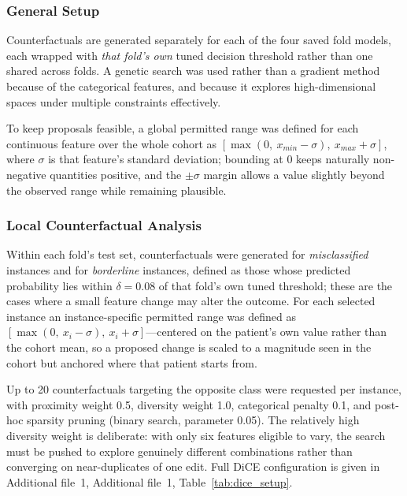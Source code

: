 \documentclass[pdflatex,sn-mathphys-num]{sn-jnl}%
\theoremstyle{thmstyleone}%
\theoremstyle{thmstyletwo}%
\theoremstyle{thmstylethree}%
\begin{document}
\subsubsection{General Setup}
\label{sec:generalsetup}
Counterfactuals are generated separately for each of the four saved fold models, each wrapped with
\textit{that fold's own} tuned decision threshold rather than one shared across folds. A genetic
search was used rather than a gradient method because of the categorical features, and because it
explores high-dimensional spaces under multiple constraints effectively.

To keep proposals feasible, a global permitted range was defined for each continuous feature over
the whole cohort as $[\max(0,\ x_{min} - \sigma),\ x_{max} + \sigma]$, where $\sigma$ is that
feature's standard deviation; bounding at 0 keeps naturally non-negative quantities positive, and
the $\pm\sigma$ margin allows a value slightly beyond the observed range while remaining plausible.

\subsubsection{Local Counterfactual Analysis}
Within each fold's test set, counterfactuals were generated for \textit{misclassified} instances and
for \textit{borderline} instances, defined as those whose predicted probability lies within
$\delta = 0.08$ of that fold's own tuned threshold; these are the cases where a small feature change
may alter the outcome. For each selected instance an instance-specific permitted range was defined
as $[\max(0,\ x_i - \sigma),\ x_i + \sigma]$---centered on the patient's own value rather than the
cohort mean, so a proposed change is scaled to a magnitude seen in the cohort but anchored where
that patient starts from.

Up to 20 counterfactuals targeting the opposite class were requested per instance, with proximity
weight 0.5, diversity weight 1.0, categorical penalty 0.1, and post-hoc sparsity pruning (binary
search, parameter 0.05). The relatively high diversity weight is deliberate: with only six features
eligible to vary, the search must be pushed to explore genuinely different combinations rather than
converging on near-duplicates of one edit. Full DiCE configuration is given in Additional file~1,
Additional file~1, Table~\ref{tab:dice_setup}.
\end{document}
